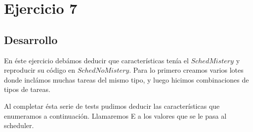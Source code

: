 \section{Ejercicio 7}
\subsection{Desarrollo}
En \'este ejercicio deb\'amos deducir que caracter\'isticas ten\'ia el $SchedMistery$ y reproducir su c\'odigo en $SchedNoMistery$. Para lo primero creamos varios lotes donde incl\'amos muchas tareas del mismo tipo, y luego hicimos combinaciones de tipos de tareas.

Al completar \'esta serie de tests pudimos deducir las caracter\'isticas que enumeramos a continuaci\'on. Llamaremos E a los valores que se le pasa al scheduler.\\


